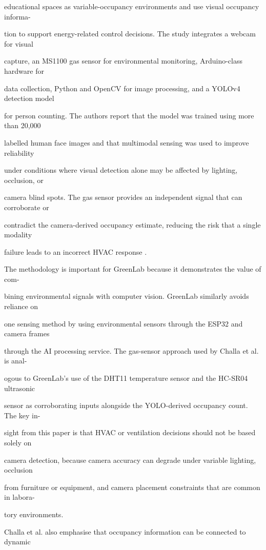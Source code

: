 educational spaces as variable-occupancy environments and use visual occupancy informa-

tion to support energy-related control decisions. The study integrates a webcam for visual

capture, an MS1100 gas sensor for environmental monitoring, Arduino-class hardware for

data collection, Python and OpenCV for image processing, and a YOLOv4 detection model

for person counting. The authors report that the model was trained using more than 20,000

labelled human face images and that multimodal sensing was used to improve reliability

under conditions where visual detection alone may be affected by lighting, occlusion, or

camera blind spots. The gas sensor provides an independent signal that can corroborate or

contradict the camera-derived occupancy estimate, reducing the risk that a single modality

failure leads to an incorrect HVAC response \cite{challa2025}.

The methodology is important for GreenLab because it demonstrates the value of com-

bining environmental signals with computer vision. GreenLab similarly avoids reliance on

one sensing method by using environmental sensors through the ESP32 and camera frames

through the AI processing service. The gas-sensor approach used by Challa et al. is anal-

ogous to GreenLab's use of the DHT11 temperature sensor and the HC-SR04 ultrasonic

sensor as corroborating inputs alongside the YOLO-derived occupancy count. The key in-

sight from this paper is that HVAC or ventilation decisions should not be based solely on

camera detection, because camera accuracy can degrade under variable lighting, occlusion

from furniture or equipment, and camera placement constraints that are common in labora-

tory environments.

Challa et al. also emphasise that occupancy information can be connected to dynamic

